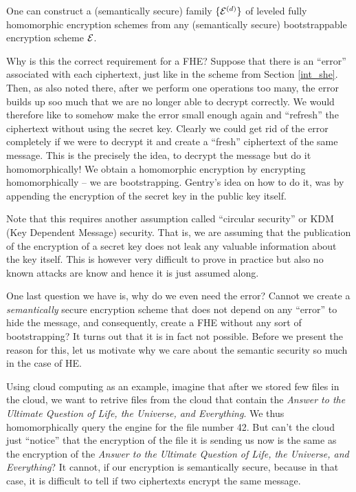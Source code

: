 \begin{theorem}\label{boot}
  One can construct a (semantically secure) family $\{ \mathcal{E}^{(d)} \}$ of leveled fully homomorphic encryption schemes from any (semantically secure) bootstrappable encryption scheme $\mathcal{E}$.
\end{theorem}

Why is this the correct requirement for a FHE? Suppose that there is an ``error'' associated with each ciphertext, just like in the scheme from Section \ref{int_she}. Then, as also noted there, after we perform one operations too many, the error builds up soo much that we are no longer able to decrypt correctly. We would therefore like to somehow make the error small enough again and ``refresh'' the ciphertext without using the secret key. Clearly we could get rid of the error completely if we were to decrypt it and create a ``fresh'' ciphertext of the same message. This is the precisely the idea, to decrypt the message but do it homomorphically! We obtain a homomorphic encryption by encrypting homomorphically -- we are bootstrapping. Gentry's idea on how to do it, was by appending the encryption of the secret key in the public key itself.

\begin{remark}
Note that this requires another assumption called ``circular security'' or KDM (Key Dependent Message) security. That is, we are assuming that the publication of the encryption of a secret key does not leak any valuable information about the key itself. This is however very difficult to prove in practice but also no known attacks are know and hence it is just assumed along.
\end{remark}

One last question we have is, why do we even need the error? Cannot we create a \textit{semantically} secure encryption scheme that does not depend on any ``error'' to hide the message, and consequently, create a FHE without any sort of bootstrapping? It turns out that it is in fact not possible. Before we present the reason for this, let us motivate why we care about the semantic security so much in the case of HE.

\begin{example}
	Using cloud computing as an example, imagine that after we stored few files in the cloud, we want to retrive files from the cloud that contain the \textit{Answer to the Ultimate Question of Life, the Universe, and Everything}. We thus homomorphically query the engine for the file number 42. But can't the cloud just ``notice'' that the encryption of the file it is sending us now is the same as the encryption of the \textit{Answer to the Ultimate Question of Life, the Universe, and Everything}? It cannot, if our encryption is semantically secure, because in that case, it is difficult to tell if two ciphertexts encrypt the same message.
\end{example}

